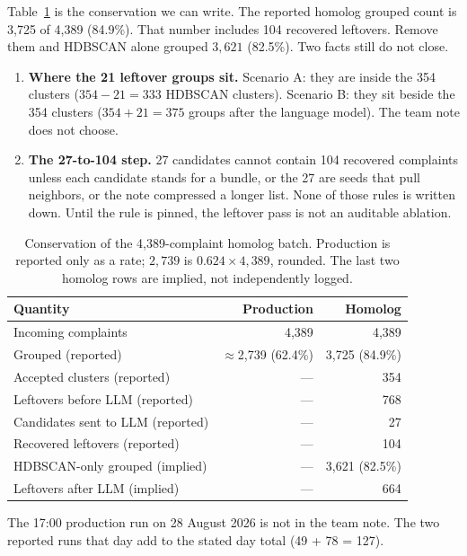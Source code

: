 \documentclass[acmlarge,screen]{acmart}
\begin{document}
Table~\ref{tab:count} is the conservation we can write. The reported homolog grouped count is 3{,}725 of 4{,}389 (84.9\%). That number includes 104 recovered leftovers. Remove them and HDBSCAN alone grouped $3{,}621$ (82.5\%). Two facts still do not close.

\begin{enumerate}
\item \textbf{Where the 21 leftover groups sit.} Scenario A: they are inside the 354 clusters ($354-21=333$ HDBSCAN clusters). Scenario B: they sit beside the 354 clusters ($354+21=375$ groups after the language model). The team note does not choose.
\item \textbf{The 27-to-104 step.} 27 candidates cannot contain 104 recovered complaints unless each candidate stands for a bundle, or the 27 are seeds that pull neighbors, or the note compressed a longer list. None of those rules is written down. Until the rule is pinned, the leftover pass is not an auditable ablation.
\end{enumerate}

\begin{table}[t]
\caption{Conservation of the 4{,}389-complaint homolog batch. Production is reported only as a rate; $2{,}739$ is $0.624 \times 4{,}389$, rounded. The last two homolog rows are implied, not independently logged.}
\label{tab:count}
\begin{tabular}{lrr}
\toprule
Quantity & Production & Homolog \\
\midrule
Incoming complaints & 4{,}389 & 4{,}389 \\
Grouped (reported) & $\approx$2{,}739 (62.4\%) & 3{,}725 (84.9\%) \\
Accepted clusters (reported) & --- & 354 \\
Leftovers before LLM (reported) & --- & 768 \\
Candidates sent to LLM (reported) & --- & 27 \\
Recovered leftovers (reported) & --- & 104 \\
HDBSCAN-only grouped (implied) & --- & 3{,}621 (82.5\%) \\
Leftovers after LLM (implied) & --- & 664 \\
\bottomrule
\end{tabular}
\end{table}

The 17:00 production run on 28 August 2026 is not in the team note. The two reported runs that day add to the stated day total (49 + 78 = 127).
\end{document}
